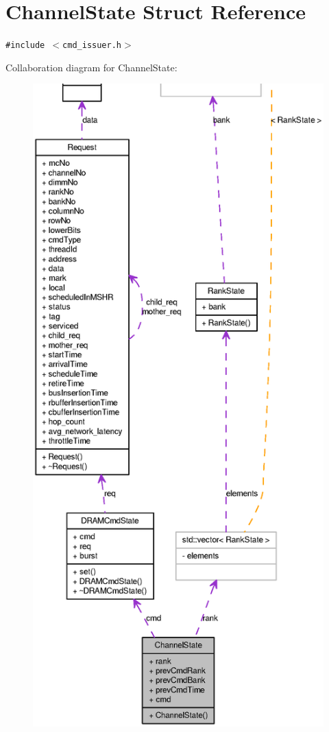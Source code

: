 \section{ChannelState Struct Reference}
\label{structChannelState}
{\tt \#include $<$cmd\_\-issuer.h$>$}

Collaboration diagram for ChannelState:\nopagebreak
\begin{figure}[H]
\begin{center}
\leavevmode
\includegraphics[width=400pt]{structChannelState__coll__graph}
\end{center}
\end{figure}
